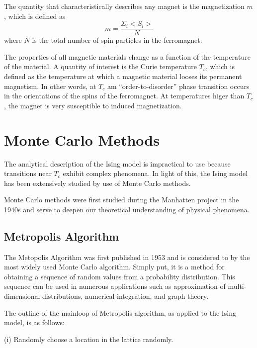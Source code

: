 \documentclass[11pt,letterpaper,fleqn]{article}
\begin{document}
The quantity that characteristically describes any magnet is the magnetization $m$, which is defined as
\[
m = \frac{\Sigma_{i} <S_{i}>}{N}
\]
where $N$ is the total number of spin particles in the ferromagnet.  


The properties of all magnetic materials change as a function of the temperature of the material.  A quantity of interest is the
Curie temperature $T_{c}$, which is defined as the temperature at which a magnetic material looses its permanent magnetism.  
In other words, at $T_{c}$ am ``order-to-disorder'' phase transition occurs in the orientations of the spins of the ferromagnet. 
At temperatures higer than $T_{c}$, the magnet is very susceptible to induced magnetization.
\newline


\section*{Monte Carlo Methods}

The analytical description of the Ising model is impractical to use because transitions near $T_{c}$ exhibit complex phenomena.
In light of this, the Ising model has been extensively studied by use of Monte Carlo methods.


Monte Carlo methods were first studied during the Manhatten project in the 1940s and serve to deepen our theoretical understanding
of physical phenomena.



\subsection*{Metropolis Algorithm}

The Metopolis Algorithm was first published in 1953 and is considered to by the most widely used Monte Carlo algorithm.
Simply put, it is a method for obtaining a sequence of random values from a probability distribution. This sequence can be used
in numerous applications such as approximation of multi-dimensional distributions, numerical integration, and graph theory. 

The outline of the mainloop of Metropolis algorithm, as applied to the Ising model, is as follows:
\newline

(i) Randomly choose a location in the lattice randomly.
\newline
\end{document}
